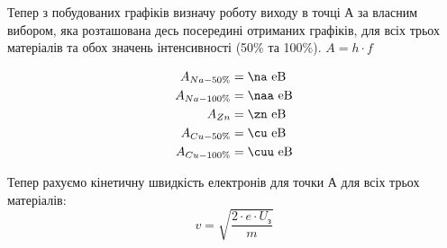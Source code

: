 \documentclass[a4paper,14pt]{extreport}
\begin{document}
\begin{center}
\begin{minipage}{0.4\textwidth}
		\end{minipage}
		\hfill
		\begin{minipage}{0.4\textwidth}
	\end{minipage}
		
	\end{center}



	
		Тепер з побудованих графіків визначу  роботу виходу в точці А за власним вибором, яка розташована десь посередині отриманих графіків, для всіх трьох матеріалів та обох значень інтенсивності (50\% та 100\%). $A = h\cdot f$
	

	\FPeval{}
	\FPeval{}

	\FPeval{}

	\FPeval{}
	\FPeval{}


	\begin{align*}
		A_{Na-50\%} &= \na \text{ eB}\\
		A_{Na-100\%} &= \naa \text{ eB}\\
		A_{Zn} &= \zn \text{ eB}\\
		A_{Cu-50\%} &= \cu \text{ eB}\\
		A_{Cu-100\%} &= \cuu \text{ eB}\\
	\end{align*}
 

	Тепер рахуємо кінетичну швидкість електронів для точки А для всіх трьох матеріалів:
	\begin{equation}
		v = \sqrt{ \dfrac{2\cdot e\cdot U_{\text{з}}}{m} }
	\end{equation}
\end{document}
